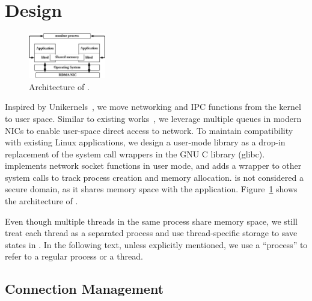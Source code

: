 \section{Design}
\label{sec:intra-server}


\begin{figure}[t]
	\centering
	\includegraphics[width=0.3\textwidth]{images/architecture}
	\caption{Architecture of \sys{}.}
	\label{fig:architecture}
\end{figure}


Inspired by Unikernels~\cite{madhavapeddy2013unikernels}, we move networking and IPC functions from the kernel to user space. Similar to existing works~\cite{peter2016arrakis,jeong2014mtcp,libvma}, we leverage multiple queues in modern NICs to enable user-space direct access to network. %
To maintain compatibility with existing Linux applications, we design a user-mode library \libipc as a drop-in replacement of the system call wrappers in the GNU C library (glibc). \libipc{} implements network socket functions in user mode, and adds a wrapper to other system calls to track process creation and memory allocation. \libipc{} is not considered a secure domain, as it shares memory space with the application. Figure~\ref{fig:architecture} shows the architecture of \sys{}.

Even though multiple threads in the same process share memory space, we still treat each thread as a separated process and use thread-specific storage to save states in \libipc. In the following text, unless explicitly mentioned, we use a ``process'' to refer to a regular process or a thread.

\subsection{Connection Management}
\label{subsec:socket-api}



